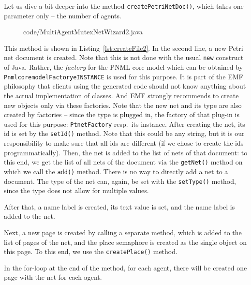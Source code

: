 %
Let us dive a bit deeper into the method {\tt createPetriNetDoc()}, which
takes one parameter only -- the number of agents.
%
\begin{figure}[htbp!]
%
  {code/MultiAgentMutexNetWizard2.java}
\end{figure}
%
This method is shown in Listing~\ref{lst:createFile2}. In the
second line, a new Petri net document is created. Note that this is not done
with the usual {\tt new} construct of Java. Rather, the \emph{factory}%
for the PNML core model which can be obtained by
{\tt Pnmlcoremodel\optsep{}Factory\qnsep{}eINSTANCE}%
is used for this purpose. It is part of the EMF philosophy that clients using
the generated code should not know anything about the actual implementation
of classes. And EMF strongly recommends to create new objects only via these factories.
Note that the new net and its type are also created by factories --
since the type is plugged in, the factory of that plug-in is used for
this purpose: {\tt PtnetFactory}%
resp.\ its instance. After
creating the net, its id is set by the {\tt setId()} method. Note that this
could be any string, but it is our responsibility to make sure that all ids
are different (if we chose to create the ids programmatically). Then, the net is
added to the list of nets of that document: to this end, we get
the list of all nets of the document via the {\tt getNet()} method on which we
call the {\tt add()} method. There is no way to directly add a net to
a document. The type of the net can, again, be set with the {\tt setType()}
method, since the type does not allow for multiple values.

After that, a name label is created, its text value is set, and the
name label is added to the net. 

Next, a new page is created by calling a separate method, which is added
to the list of pages of the net, and the place semaphore is created
as the single object on this page. To this end, we use the
{\tt createPlace()} method. 

In the for-loop at the end of the method, for each agent, there
will be created one page with the net for each agent.

